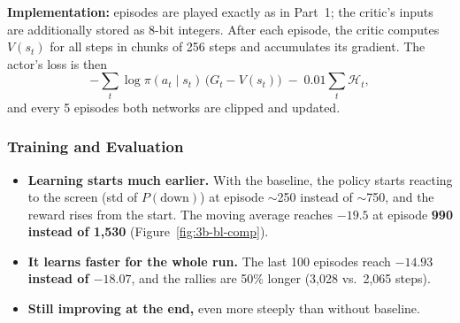 \textbf{Implementation:} episodes are played exactly as in Part~1; the critic's inputs are additionally stored as 8-bit integers. After each episode, the critic computes $V(s_t)$ for all steps in chunks of 256 steps and accumulates its gradient. The actor's loss is then
\[
  -\sum_t \log \pi(a_t \mid s_t)\,\big(G_t - V(s_t)\big) \;-\; 0.01 \sum_t \mathcal{H}_t ,
\]
and every 5 episodes both networks are clipped and updated.

\subsubsection{Training and Evaluation}



\begin{itemize}
  \item \textbf{Learning starts much earlier.} With the baseline, the policy starts reacting to the screen (std of $P(\text{down})$) at episode $\sim$250 instead of $\sim$750, and the reward rises from the start. The moving average reaches $-19.5$ at episode \textbf{990 instead of 1,530} (Figure~\ref{fig:3b-bl-comp}).
  \item \textbf{It learns faster for the whole run.} The last 100 episodes reach \textbf{$-14.93$ instead of $-18.07$}, and the rallies are 50\% longer (3,028 vs.\ 2,065 steps).
  \item \textbf{Still improving at the end,} even more steeply than without baseline.
\end{itemize}


